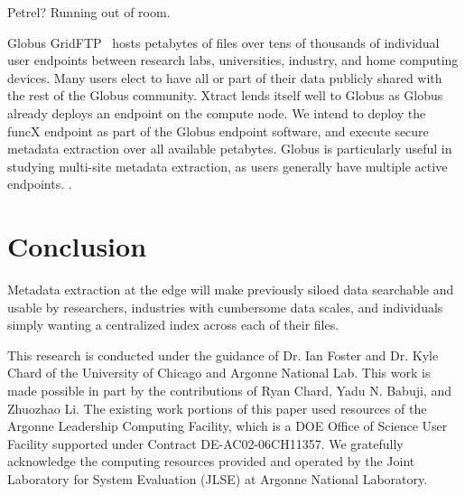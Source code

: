 \documentclass[sigconf]{acmart}
\newcommand{\tyler}[1]{}
\newcommand{\tyler}[1]{{\textcolor{cyan}{ tyler: #1 }}}
\begin{document}
Petrel? Running out of room. 

Globus GridFTP~\cite{ananthakrishnan2018globus} hosts petabytes of files over tens of thousands of individual user endpoints between research labs, 
universities, industry, and home computing devices. Many \tyler{???} users elect to have all or part of their data publicly 
shared with the rest of the Globus community. Xtract lends itself well to Globus as Globus already deploys an 
endpoint on the compute node.  We intend to deploy the funcX endpoint as part of the Globus endpoint software, and 
execute secure metadata extraction over all available petabytes. Globus is particularly useful in studying multi-site 
metadata extraction, as users generally have multiple active endpoints. \tyler{more detail}. 



\section{Conclusion}
\label{sec:conc}

Metadata extraction at the edge will make previously siloed data searchable and usable by researchers, 
industries with cumbersome data scales, and individuals simply wanting a centralized index across 
each of their files. 


\begin{acks}

This research is conducted under the guidance of Dr. Ian Foster and Dr. Kyle Chard of the 
University of Chicago and Argonne National Lab. This work is made possible in part by the contributions
of Ryan Chard, Yadu N. Babuji, and Zhuozhao Li. The existing work portions of this paper used resources of the
Argonne Leadership Computing Facility, which is a DOE Office of Science User
Facility supported under Contract DE-AC02-06CH11357. 
We gratefully acknowledge the computing resources provided and 
operated by the Joint Laboratory for System Evaluation (JLSE) at Argonne National Laboratory. 


\end{acks}


\end{document}
